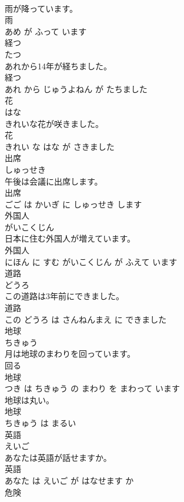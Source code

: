 \documentclass[8pt]{extreport}
\begin{document}
\begin{CJK}{UTF8}{min}
\\	雨が降っています。	
\\	雨 
\\	あめ が ふって います			
\\	経つ	
\\	たつ			
\\	あれから14年が経ちました。	
\\	経つ 
\\	あれ から じゅうよねん が たちました			
\\	花	
\\	はな			
\\	きれいな花が咲きました。	
\\	花 
\\	きれい な はな が さきました			
\\	出席	
\\	しゅっせき			
\\	午後は会議に出席します。	
\\	出席 
\\	ごご は かいぎ に しゅっせき します			
\\	外国人	
\\	がいこくじん			
\\	日本に住む外国人が増えています。	
\\	外国人 
\\	にほん に すむ がいこくじん が ふえて います			
\\	道路	
\\	どうろ			
\\	この道路は3年前にできました。	
\\	道路 
\\	この どうろ は さんねんまえ に できました			
\\	地球	
\\	ちきゅう			
\\	月は地球のまわりを回っています。	
\\	回る 
\\	地球 
\\	つき は ちきゅう の まわり を まわって います			
\\	地球は丸い。	
\\	地球 
\\	ちきゅう は まるい			
\\	英語	
\\	えいご			
\\	あなたは英語が話せますか。	
\\	英語 
\\	あなた は えいご が はなせます か			
\\	危険	

\end{CJK}
\end{document}
